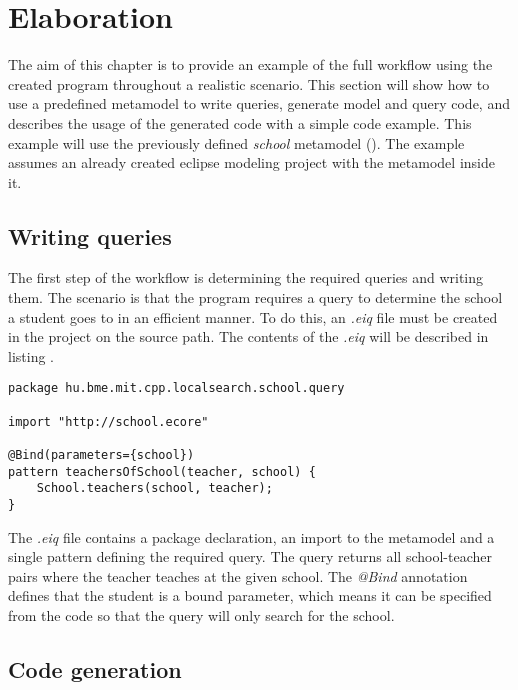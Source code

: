\chapter{Elaboration}

The aim of this chapter is to provide an example of the full workflow using the
created program throughout a realistic scenario. This section will show how to
use a predefined metamodel to write queries, generate model and query code, and
describes the usage of the generated code with a simple code example. This
example will use the previously defined \emph{school} metamodel
(). The example assumes an already created
eclipse modeling project with the metamodel inside it.

\section{Writing queries}

The first step of the workflow is determining the required queries and writing
them. The scenario is that the \CPP{} program requires a query to determine the
school a student goes to in an efficient manner. To do this, an \emph{.eiq} file
must be created in the project on the source path. The contents of the
\emph{.eiq} will be described in listing .

\begin{lstlisting}[frame=single,float=!ht,language=IQPL,
label=listing:example_school_eiq, caption=The \emph{.eiq} file for the example
project] 
package hu.bme.mit.cpp.localsearch.school.query

import "http://school.ecore"

@Bind(parameters={school})
pattern teachersOfSchool(teacher, school) {
	School.teachers(school, teacher);
}
\end{lstlisting}

The \emph{.eiq} file contains a package declaration, an import to the metamodel
and a single pattern defining the required query. The query returns all
school-teacher pairs where the teacher teaches at the given school. The
\emph{@Bind} annotation defines that the student is a bound parameter, which
means it can be specified from the code so that the query will only search for
the school.

\section{Code generation}

